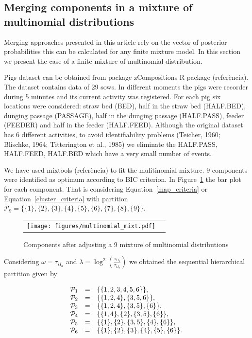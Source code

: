 \documentclass[10pt, a4paper]{article}
\newcommand{\pkg}[1]{{\fontseries{b}\selectfont #1}}
\begin{document}
\begin{spacing}{1.9}
\subsection{Merging components in a mixture of multinomial distributions}

Merging approaches presented in this article rely on the vector of posterior probabilities this can be calculated for any finite mixture model. In this section we present the case of a finite mixture of multinomial distribution.

Pigs dataset can be obtained from package \pkg{zCompositions} R package (referència). The dataset contains data of 29 sows. In different moments the pigs were recorder during 5 minutes and its current activity was registered. For each pig six locations were considered: straw bed (BED), half in the straw bed (HALF.BED), dunging passage (PASSAGE), half in the dunging passage (HALF.PASS), feeder (FEEDER) and half in the feeder (HALF.FEED). Although the original dataset has 6 different activities, to avoid identifiability problems (Teicher, 1960; Blischke, 1964; Titterington et al., 1985) we eliminate the HALF.PASS, HALF.FEED, HALF.BED which have a very small number of events.

We have used \pkg{mixtools} (referència) to fit the mulitinomial mixture. 9 components were identified as optimum according to BIC criterion. In Figure~\ref{multinomial_mixture} the bar plot for each component. That is considering Equation~\ref{map_criteria} or Equation~\ref{cluster_criteria} with partition $\mathcal{P}_9 = \{\{1\}, \{2\}, \{3\}, \{4\}, \{5\}, \{6\}, \{7\}, \{8\}, \{9\} \}$.

\begin{figure}[t]
\begin{center}
\begin{tabular}{cc}
  \texttt{[image: figures/multinomial\_mixt.pdf]} \\
 \end{tabular}
 \caption{Components after adjusting a 9 mixture of multinomial distributions}\label{multinomial_mixture}
\end{center}
\end{figure}

Considering $\omega = \tau_{i I_a}$ and $\lambda = \log^2 \left(\frac{ \tau_{iI_b} }{ \tau_{iI_a} }\right)$ we obtained the sequential hierarchical partition given by


\begin{equation}
\begin{array}{r c l}
\mathcal{P}_1 &=& \{\{1,2,3,4,5,6\}\}, \\ 
\mathcal{P}_2 &=& \{\{1,2,4\},\{3,5,6\}\}, \\ 
\mathcal{P}_3 &=& \{\{1,2,4\},\{3,5\},\{6\}\}, \\ 
\mathcal{P}_4 &=& \{\{1,4\},\{2\},\{3,5\},\{6\}\}, \\ 
\mathcal{P}_5 &=& \{\{1\},\{2\},\{3,5\},\{4\},\{6\}\}, \\ 
\mathcal{P}_6 &=& \{\{1\},\{2\},\{3\},\{4\},\{5\},\{6\} \}.
\end{array}
\label{hier_ex_multinomial}
\end{equation}


\end{spacing}
\end{document}
